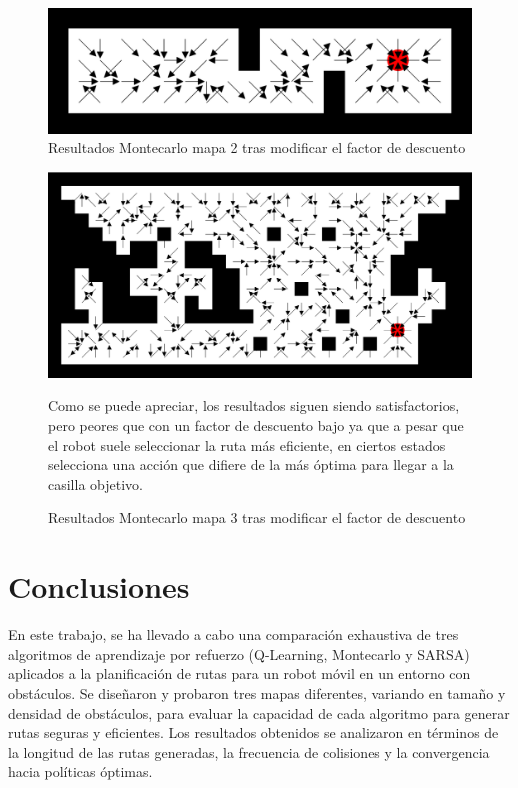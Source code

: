 \documentclass[conference,a4paper]{IEEEtran}
\begin{document}
\begin{figure}[h]
  \centering
  \includegraphics[scale=0.18]{report/Montecarlo0.9_2.png}
  \caption{Resultados Montecarlo mapa 2 tras modificar el factor de descuento}
  \label{fig:Montecarlo0.9_2}
\end{figure}

\begin{figure}[h]
  \includegraphics[scale=0.18]{report/Montecarlo0.9_3.png}
  \caption{Resultados Montecarlo mapa 3 tras modificar el factor de descuento}
  \label{fig:Montecarlo0.9_3}
  \vspace{0.5cm}
  Como se puede apreciar, los resultados siguen siendo satisfactorios, pero peores que con un factor de descuento bajo ya que a pesar que el robot suele seleccionar la ruta más eficiente, en ciertos estados selecciona una acción que difiere de la más óptima para llegar a la casilla objetivo.\newline
\end{figure}

\section{Conclusiones}

En este trabajo, se ha llevado a cabo una comparación exhaustiva de tres algoritmos de aprendizaje por refuerzo (Q-Learning, Montecarlo y SARSA) aplicados a la planificación de rutas para un robot móvil en un entorno con obstáculos.
Se diseñaron y probaron tres mapas diferentes, variando en tamaño y densidad de obstáculos, para evaluar la capacidad de cada algoritmo para generar rutas seguras y eficientes. Los resultados obtenidos se analizaron 
en términos de la longitud de las rutas generadas, la frecuencia de colisiones y la convergencia hacia políticas óptimas.\newline
\end{document}

